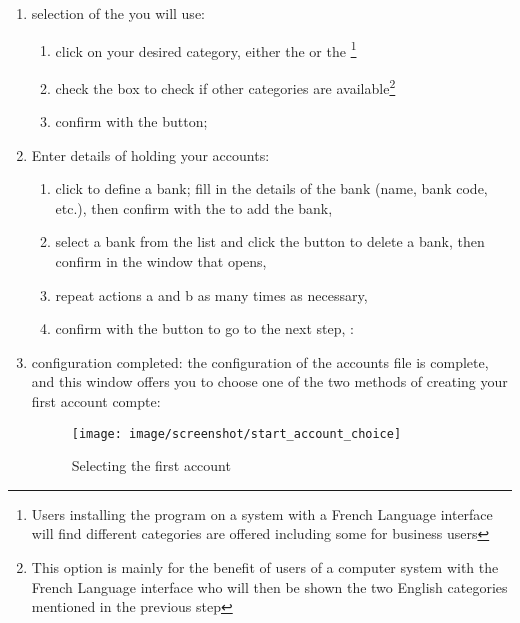 \begin{enumerate}
\item selection of the   you will use:
\begin{enumerate} 
 \item click on your desired category, either the  or the  \footnote{ Users installing the program on a system with a French Language interface will find different categories are offered including some for business users} 
\item check the  box to check if other categories are available\footnote{ This option is mainly for the benefit of users of a computer system with the French Language interface who will then be shown the two English categories mentioned in the previous step}
\item confirm with the  button;
\end{enumerate}

\item Enter details of  holding your accounts:
\begin{enumerate} 
 \item click   to define a bank; fill in the details of the bank (name, bank code, etc.), then confirm with the  to add the bank,
\item select a bank from the list and click the  button to delete a bank, then confirm in the window that opens,
\item repeat actions a and b as many times as necessary,
\item  confirm with the   button to go to the next step, :
\end{enumerate} 

\item configuration completed: the configuration of the accounts file is complete, and this window offers you to choose one of the two methods of creating your first account
compte:


\begin{figure}[ht]
\begin{center}
\texttt{[image: image/screenshot/start\_account\_choice]}
\end{center}
\caption{Selecting the first account}
\label{start-account-choice-img}
\end{figure}



\end{enumerate}
